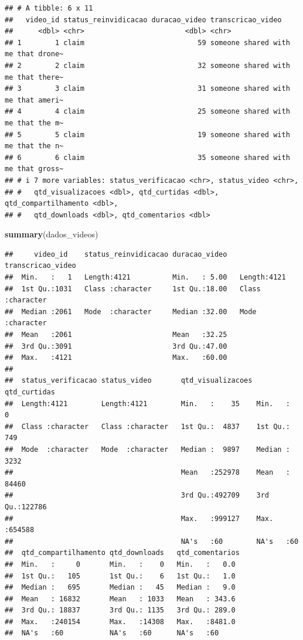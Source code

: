 \documentclass[
]{article}
\newenvironment{Shaded}{\begin{snugshade}}{\end{snugshade}}
\newcommand{\FunctionTok}[1]{\textcolor[rgb]{0.13,0.29,0.53}{\textbf{#1}}}
\newcommand{\NormalTok}[1]{#1}
\begin{document}
\begin{verbatim}
## # A tibble: 6 x 11
##   video_id status_reinvidicacao duracao_video transcricao_video                 
##      <dbl> <chr>                        <dbl> <chr>                             
## 1        1 claim                           59 someone shared with me that drone~
## 2        2 claim                           32 someone shared with me that there~
## 3        3 claim                           31 someone shared with me that ameri~
## 4        4 claim                           25 someone shared with me that the m~
## 5        5 claim                           19 someone shared with me that the n~
## 6        6 claim                           35 someone shared with me that gross~
## # i 7 more variables: status_verificacao <chr>, status_video <chr>,
## #   qtd_visualizacoes <dbl>, qtd_curtidas <dbl>, qtd_compartilhamento <dbl>,
## #   qtd_downloads <dbl>, qtd_comentarios <dbl>
\end{verbatim}

\begin{Shaded}
\begin{Highlighting}[]
\FunctionTok{summary}\NormalTok{(dados\_videos)}
\end{Highlighting}
\end{Shaded}

\begin{verbatim}
##     video_id    status_reinvidicacao duracao_video   transcricao_video 
##  Min.   :   1   Length:4121          Min.   : 5.00   Length:4121       
##  1st Qu.:1031   Class :character     1st Qu.:18.00   Class :character  
##  Median :2061   Mode  :character     Median :32.00   Mode  :character  
##  Mean   :2061                        Mean   :32.25                     
##  3rd Qu.:3091                        3rd Qu.:47.00                     
##  Max.   :4121                        Max.   :60.00                     
##                                                                        
##  status_verificacao status_video       qtd_visualizacoes  qtd_curtidas   
##  Length:4121        Length:4121        Min.   :    35    Min.   :     0  
##  Class :character   Class :character   1st Qu.:  4837    1st Qu.:   749  
##  Mode  :character   Mode  :character   Median :  9897    Median :  3232  
##                                        Mean   :252978    Mean   : 84460  
##                                        3rd Qu.:492709    3rd Qu.:122786  
##                                        Max.   :999127    Max.   :654588  
##                                        NA's   :60        NA's   :60      
##  qtd_compartilhamento qtd_downloads   qtd_comentarios 
##  Min.   :     0       Min.   :    0   Min.   :   0.0  
##  1st Qu.:   105       1st Qu.:    6   1st Qu.:   1.0  
##  Median :   695       Median :   45   Median :   9.0  
##  Mean   : 16832       Mean   : 1033   Mean   : 343.6  
##  3rd Qu.: 18837       3rd Qu.: 1135   3rd Qu.: 289.0  
##  Max.   :240154       Max.   :14308   Max.   :8481.0  
##  NA's   :60           NA's   :60      NA's   :60
\end{verbatim}
\end{document}
